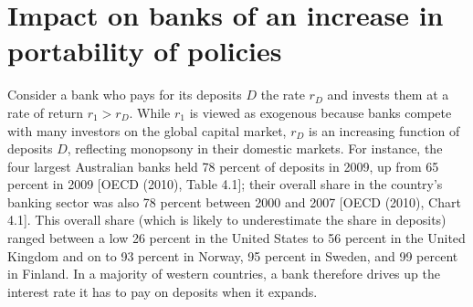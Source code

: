 \section{Impact on banks of an increase in portability of policies}
\label{sec:impactbank}








Consider a bank who pays for its deposits $D$ the rate $r_D$ and invests them at a rate of return $r_1 > r_D$. While $r_1$ is viewed as exogenous because banks compete with many investors on the global capital market, $r_D$ is an increasing function of deposits $D$, reflecting monopsony in their domestic markets. For instance, the four largest Australian banks held 78 percent of deposits in 2009, up from 65 percent in 2009 [OECD (2010), Table 4.1]; their overall share in the country's banking sector was also 78 percent between 2000 and 2007 [OECD (2010), Chart 4.1]. This overall share (which is likely to underestimate the share in deposits) ranged between a low 26 percent in the United States to 56 percent in the United Kingdom and on to 93 percent in Norway, 95 percent in Sweden, and 99 percent in Finland. In a majority of western countries, a bank therefore drives up the interest rate it has to pay on deposits when it expands. 


